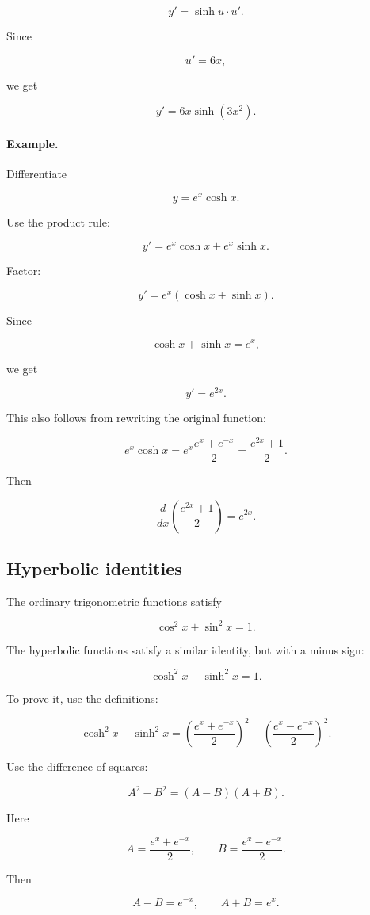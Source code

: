 \[
y'=\sinh u\cdot u'.
\]

Since

\[
u'=6x,
\]

we get

\[
\boxed{
y'=6x\sinh(3x^2).
}
\]

\paragraph{Example.}
Differentiate

\[
y=e^x\cosh x.
\]

Use the product rule:

\[
y'=e^x\cosh x+e^x\sinh x.
\]

Factor:

\[
y'=e^x(\cosh x+\sinh x).
\]

Since

\[
\cosh x+\sinh x=e^x,
\]

we get

\[
\boxed{
y'=e^{2x}.
}
\]

This also follows from rewriting the original function:

\[
e^x\cosh x
=
e^x\frac{e^x+e^{-x}}2
=
\frac{e^{2x}+1}{2}.
\]

Then

\[
\frac{d}{dx}\left(\frac{e^{2x}+1}{2}\right)=e^{2x}.
\]

\subsection{Hyperbolic identities}
\label{subsec:hyperbolic-identities}

The ordinary trigonometric functions satisfy

\[
\cos^2 x+\sin^2 x=1.
\]

The hyperbolic functions satisfy a similar identity, but with a minus sign:

\[
\boxed{
\cosh^2 x-\sinh^2 x=1.
}
\]

To prove it, use the definitions:

\[
\cosh^2x-\sinh^2x
=
\left(\frac{e^x+e^{-x}}2\right)^2
-
\left(\frac{e^x-e^{-x}}2\right)^2.
\]

Use the difference of squares:

\[
A^2-B^2=(A-B)(A+B).
\]

Here

\[
A=\frac{e^x+e^{-x}}2,
\qquad
B=\frac{e^x-e^{-x}}2.
\]

Then

\[
A-B=e^{-x},
\qquad
A+B=e^x.
\]

